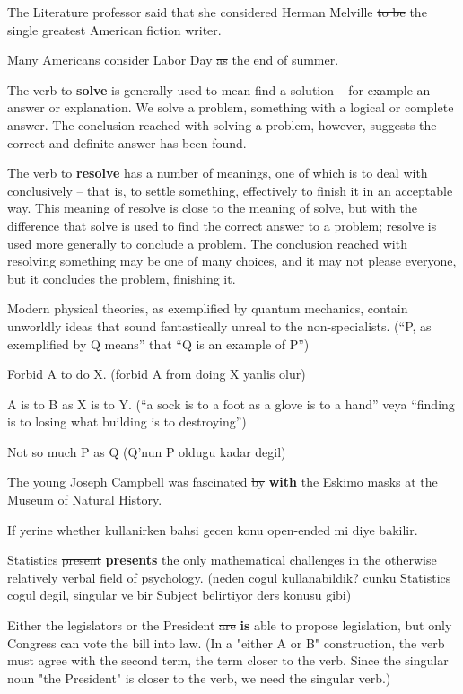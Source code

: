 \documentclass[12pt, a4paper]{ximera}
\begin{document}
The Literature professor said that she considered Herman Melville \sout{to be} the single greatest American fiction writer.

Many Americans consider Labor Day \sout{as} the end of summer.

The verb to \textbf{solve} is generally used to mean find a solution – for example an answer or explanation. We solve a problem, something with a logical or complete answer. The conclusion reached with solving a problem, however, suggests the correct and definite answer has been found.

The verb to \textbf{resolve} has a number of meanings, one of which is to deal with conclusively – that is, to settle something, effectively to finish it in an acceptable way. This meaning of resolve is close to the meaning of solve, but with the difference that solve is used to find the correct answer to a problem; resolve is used more generally to conclude a problem. The conclusion reached with resolving something may be one of many choices, and it may not please everyone, but it concludes the problem, finishing it. 

Modern physical theories, as exemplified by quantum mechanics, contain unworldly ideas that sound fantastically unreal to the non-specialists. (``P, as exemplified by Q means'' that ``Q is an example of P'')

Forbid A to do X. (forbid A from doing X yanlis olur)

A is to B as X is to Y. (``a sock is to a foot as a glove is to a hand'' veya ``finding is to losing what building is to destroying'')

Not so much P as Q (Q'nun P oldugu kadar degil)

The young Joseph Campbell was fascinated \sout{by} \textbf{with} the Eskimo masks at the Museum of Natural History.

If yerine whether kullanirken bahsi gecen konu open-ended mi diye bakilir.

Statistics \sout{present} \textbf{presents} the only mathematical challenges in the otherwise relatively verbal field of psychology. (neden cogul kullanabildik? cunku Statistics cogul degil, singular ve bir Subject belirtiyor ders konusu gibi)



Either the legislators or the President \sout{are} \textbf{is} able to propose legislation, but only Congress can vote the bill into law. (In a "either A or B" construction, the verb must agree with the second term, the term closer to the verb. Since the singular noun "the President" is closer to the verb, we need the singular verb.)
\end{document}
